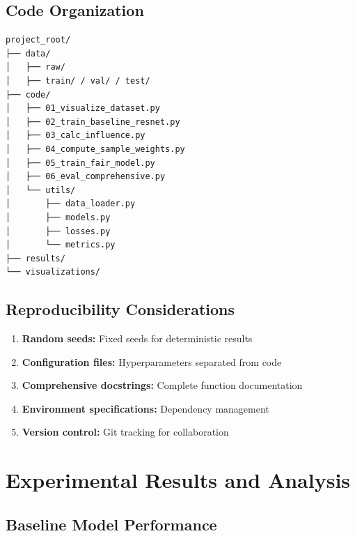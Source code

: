 \documentclass[11pt,a4paper,oneside]{report}
\begin{document}
\section{Code Organization}

\begin{lstlisting}[style=bash]
project_root/
├── data/
│   ├── raw/
│   ├── train/ / val/ / test/
├── code/
│   ├── 01_visualize_dataset.py
│   ├── 02_train_baseline_resnet.py
│   ├── 03_calc_influence.py
│   ├── 04_compute_sample_weights.py
│   ├── 05_train_fair_model.py
│   ├── 06_eval_comprehensive.py
│   └── utils/
│       ├── data_loader.py
│       ├── models.py
│       ├── losses.py
│       └── metrics.py
├── results/
└── visualizations/
\end{lstlisting}

\section{Reproducibility Considerations}

\begin{enumerate}

\item \textbf{Random seeds:} Fixed seeds for deterministic results

\item \textbf{Configuration files:} Hyperparameters separated from code

\item \textbf{Comprehensive docstrings:} Complete function documentation

\item \textbf{Environment specifications:} Dependency management

\item \textbf{Version control:} Git tracking for collaboration

\end{enumerate}


\chapter{Experimental Results and Analysis}

\section{Baseline Model Performance}
\end{document}
